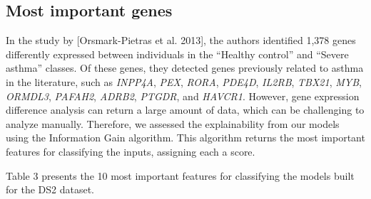 
\subsection{Most important genes} %

In the study by [Orsmark-Pietras et al. 2013], the authors identified 1,378 genes differently expressed between individuals in the “Healthy control” and “Severe asthma” classes. Of these genes, they detected genes previously related to asthma in the literature, such as \textit{INPP4A}, \textit{PEX}, \textit{RORA}, \textit{PDE4D}, \textit{IL2RB}, \textit{TBX21}, \textit{MYB}, \textit{ORMDL3}, \textit{PAFAH2}, \textit{ADRB2}, \textit{PTGDR}, and \textit{HAVCR1}. However, gene expression difference analysis can return a large amount of data, which can be challenging to analyze manually. Therefore, we assessed the explainability from our models using the Information Gain algorithm. This algorithm returns the most important features for classifying the inputs, assigning each a score.

Table 3 presents the 10 most important features for classifying the models built for the DS2 dataset.

